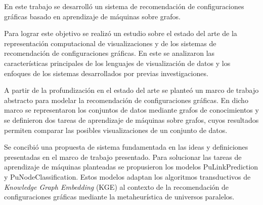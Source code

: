\begin{conclusions}



   

    


    En este trabajo se desarroll\'o un sistema de recomendaci\'on de configuraciones gr\'aficas
    basado en aprendizaje de m\'aquinas sobre grafos.

    Para lograr este objetivo se realiz\'o un estudio sobre el estado del arte de la representaci\'on
    computacional de visualizaciones y de los sistemas de recomendaci\'on de configuraciones gr\'aficas. En este se analizaron
    las caracter\'isticas principales de los lenguajes de visualizaci\'on de datos y los enfoques de los sistemas
    desarrollados por previas investigaciones.
    
    A partir de la profundizaci\'on en el estado del arte se plante\'o un marco de trabajo abstracto
    para modelar la recomendaci\'on de configuraciones gr\'aficas. En dicho marco se
    representaron los conjuntos de datos mediante grafos de conocimientos
    y se definieron dos tareas de aprendizaje de m\'aquinas sobre grafos, cuyos resultados permiten comparar las
    posibles visualizaciones de un conjunto de datos.

    Se concibi\'o una propuesta de sistema fundamentada en las ideas y definiciones presentadas en el marco
    de trabajo presentado. Para solucionar las tareas de aprendizaje de m\'aquinas planteadas se propusieron
    los modelos PuLinkPrediction y PuNodeClassification. Estos modelos adaptan
    los algoritmos transductivos de \textit{Knowledge Graph Embedding} (KGE)
    al contexto de la recomendaci\'on de configuraciones gr\'aficas mediante la metaheur\'istica de universos paralelos.



\end{conclusions}
